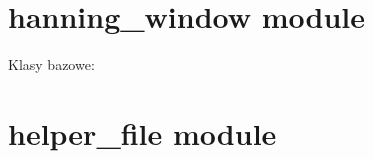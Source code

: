 \documentclass[letterpaper,10pt,polish]{sphinxmanual}
\begin{document}
\section{hanning\_window module}
\label{\detokenize{hanning_window:module-hanning_window}}\label{\detokenize{hanning_window:hanning-window-module}}\label{\detokenize{hanning_window::doc}}

\begin{fulllineitems}
\label{\detokenize{hanning_window:hanning_window.HanningWindow}}
Klasy bazowe: 

\begin{fulllineitems}
\label{\detokenize{hanning_window:hanning_window.HanningWindow.__init__}}
\end{fulllineitems}


\begin{fulllineitems}
\label{\detokenize{hanning_window:hanning_window.HanningWindow.plot}}
\end{fulllineitems}


\end{fulllineitems}



\section{helper\_file module}
\label{\detokenize{helper_file::doc}}\label{\detokenize{helper_file:module-helper_file}}\label{\detokenize{helper_file:helper-file-module}}
\end{document}
